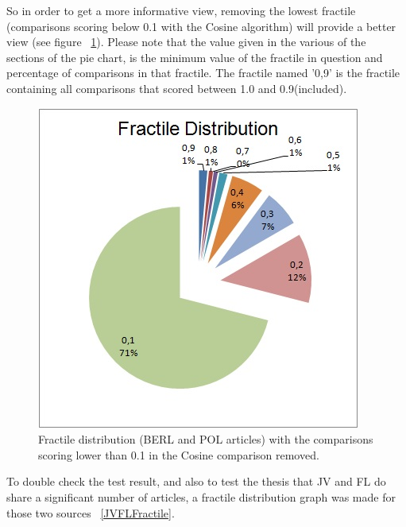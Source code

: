 So in order to get a more informative view, removing the lowest fractile (comparisons scoring below 0.1 with the Cosine algorithm) will provide a better view (see figure ~\ref{NoNoise}). Please note that the value given in the various of the sections of the pie chart, is the minimum value of the fractile in question and percentage of comparisons in that fractile. The fractile named '0,9' is the fractile containing all comparisons that scored between 1.0 and 0.9(included).

\begin{figure}
	\centering
	\includegraphics[scale=1.0]{figures/FractileNoNoise}
	\caption{Fractile distribution (BERL and POL articles) with the comparisons scoring lower than 0.1 in the Cosine comparison removed.}
	\label{NoNoise}
\end{figure}

To double check the test result, and also to test the thesis that JV and FL do share a significant number of articles, a fractile distribution graph was made for those two sources ~\ref{JVFLFractile}.

